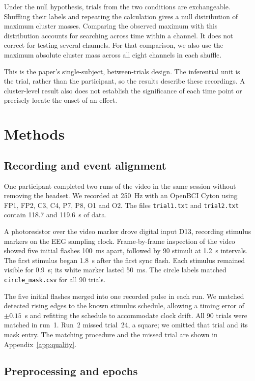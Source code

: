 \documentclass[11pt,a4paper]{article}
\begin{document}
Under the null hypothesis, trials from the two conditions are exchangeable.
Shuffling their labels and repeating the calculation gives a null distribution
of maximum cluster masses. Comparing the observed maximum with this distribution
accounts for searching across time within a channel. It does not correct for
testing several channels. For that comparison, we also use the maximum absolute
cluster mass across all eight channels in each shuffle.

This is the paper's single-subject, between-trials design. The inferential unit
is the trial, rather than the participant, so the results describe these
recordings. A cluster-level result also does not establish the significance of
each time point or precisely locate the onset of an effect.

\section{Methods}

\subsection{Recording and event alignment}

One participant completed two runs of the video in the same session without
removing the headset. We recorded at 250~Hz with an OpenBCI Cyton using FP1,
FP2, C3, C4, P7, P8, O1 and O2. The files \texttt{trial1.txt} and
\texttt{trial2.txt} contain 118.7 and 119.6~s of data.

A photoresistor over the video marker drove digital input D13, recording
stimulus markers on the EEG sampling clock. Frame-by-frame inspection of the
video showed five initial flashes 100~ms apart, followed by 90 stimuli at
1.2~s intervals. The first stimulus began 1.8~s after the first sync flash.
Each stimulus remained visible for 0.9~s; its white marker lasted 50~ms.
The circle labels matched \texttt{circle\_mask.csv} for all 90 trials.

The five initial flashes merged into one recorded pulse in each run. We matched
detected rising edges to the known stimulus schedule, allowing a timing error
of $\pm0.15$~s and refitting the schedule to accommodate clock drift. All 90
trials were matched in run~1. Run~2 missed trial~24, a square; we omitted that
trial and its mask entry. The matching procedure and the missed trial are
shown in Appendix~\ref{app:quality}.

\subsection{Preprocessing and epochs}
\end{document}
